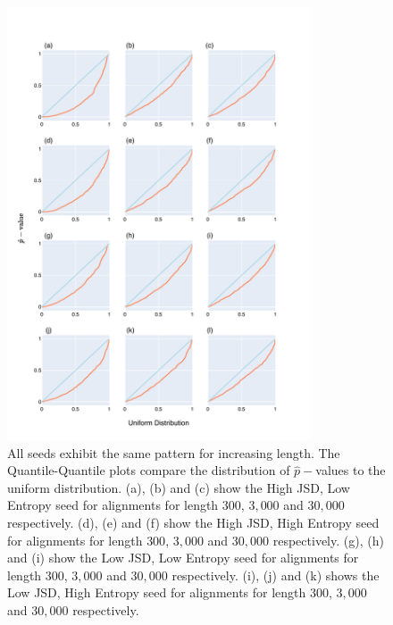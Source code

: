 \begin{figure}[!ht]
\centering
\includegraphics[width=0.8\textwidth]{figures/plots/synthetic/lrt/all-seeds.pdf}
\caption{All seeds exhibit the same pattern for increasing length. The Quantile-Quantile plots compare the distribution of $\hat p-$values to the uniform distribution. (a), (b) and (c) show the High JSD, Low Entropy seed for alignments for length $300$, $3,000$ and $30,000$ respectively. (d), (e) and (f) show the High JSD, High Entropy seed for alignments for length $300$, $3,000$ and $30,000$ respectively. (g), (h) and (i) show the Low JSD, Low Entropy seed for alignments for length $300$, $3,000$ and $30,000$ respectively. (i), (j) and (k) shows the Low JSD, High Entropy seed for alignments for length $300$, $3,000$ and $30,000$ respectively.
}
\label{fig:synthetic/lrt/all-seeds}
\end{figure}